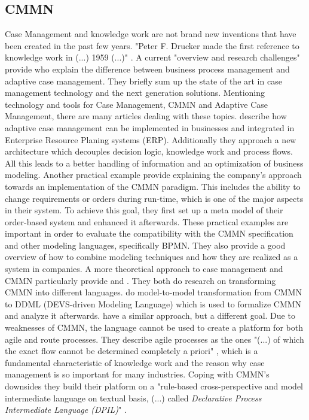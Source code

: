 \documentclass[11pt,a4paper,draft]{article}
\begin{document}
\subsection{CMMN}
Case Management and knowledge work are not brand new inventions that have been created in the past few years. "Peter F. Drucker made the first reference to knowledge work in (...) 1959 (...)" \citep{Motahari-NezhadSwenson2013}. A current "overview and research challenges" provide \citep{Motahari-NezhadSwenson2013} who explain the difference between business process management and adaptive case management. They briefly sum up the state of the art in case management technology and the next generation solutions. 
Mentioning technology and tools for Case Management, CMMN and Adaptive Case Management, there are many articles dealing with these topics. \citep{OsuszekStanek2015} describe how adaptive case management can be implemented in businesses and integrated in Enterprise Resource Planing systems (ERP). Additionally they approach a new architecture which decouples decision logic, knowledge work and process flows. All this leads to a better handling of information and an optimization of business modeling. 
Another practical example provide \citep{Kuzin2013} explaining the company's approach towards an implementation of the CMMN paradigm. This includes the ability to change requirements or orders during run-time, which is one of the major aspects in their system. To achieve this goal, they first set up a meta model of their order-based system and enhanced it afterwards. 
These practical examples are important in order to evaluate the compatibility with the CMMN specification and other modeling languages, specifically BPMN. They also provide a good overview of how to combine modeling techniques and how they are realized as a system in companies. 
A more theoretical approach to case management and CMMN particularly provide \citep{WangTraore2014} and \citep{Zeising_2014}. They both do research on transforming CMMN into different languages. \citep{WangTraore2014} do model-to-model transformation from CMMN to  DDML (DEVS-driven Modeling Language) which is used to formalize CMMN and analyze it afterwards. \citep{Zeising_2014} have a similar approach, but a different goal. Due to weaknesses of CMMN, the language cannot be used to create a platform for both agile and route processes. They describe agile processes as the ones "(...) of which the exact flow cannot be determined completely a priori" \citep{Zeising_2014}, which is a fundamental characteristic of knowledge work and the reason why case management is so important for many industries. Coping with CMMN's downsides they build their platform on a "rule-based cross-perspective and model intermediate language on textual basis, (...) called \textit{Declarative Process Intermediate Language (DPIL)}" \citep{Zeising_2014}. \\
\end{document}
